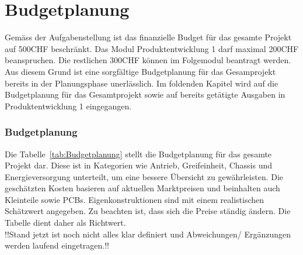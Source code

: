 \documentclass[main.tex]{subfiles} %
\begin{document}

\section{Budgetplanung}

Gemäss der Aufgabenstellung ist das finanzielle Budget für das gesamte Projekt auf 500CHF beschränkt.
Das Modul Produktentwicklung 1 darf maximal 200CHF beanspruchen. Die restlichen 300CHF können im 
Folgemodul beantragt werden.
Aus diesem Grund ist eine sorgfältige Budgetplanung für das Gesamprojekt bereits in der Planungsphase
unerlässlich. Im foldenden Kapitel wird auf die Budgetplanung für das Gesamtprojekt
sowie auf bereits getätigte Ausgaben in Produktentwicklung 1 eingegangen.

\subsubsection*{Budgetplanung}
Die Tabelle~\ref{tab:Budgetplanung} stellt die Budgetplanung für das gesamte Projekt dar. Diese ist in 
Kategorien wie Antrieb, Greifeinheit, Chassis und Energieversorgung unterteilt, um eine 
bessere Übersicht zu gewährleisten. Die geschätzten Kosten basieren auf aktuellen Marktpreisen und 
beinhalten auch Kleinteile sowie PCBs. Eigenkonstruktionen sind mit einem realistischen 
Schätzwert angegeben. Zu beachten ist, dass sich die Preise ständig ändern. Die Tabelle dient daher
als Richtwert.\\

!!Stand jetzt ist noch nicht alles klar definiert und Abweichungen/ Ergänzungen werden laufend eingetragen.!!

\newpage
\end{document}
